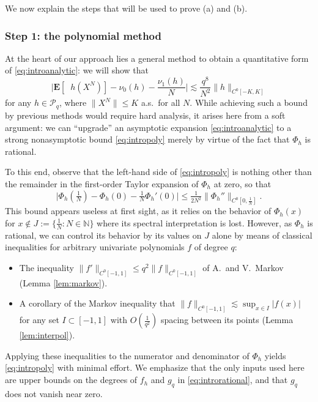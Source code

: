 \documentclass[10pt,reqno]{amsart}
\theoremstyle{definition}
\theoremstyle{remark}
\numberwithin{equation}{section}
\numberwithin{figure}{section}
\numberwithin{table}{section}
\newcommand{\ntrN}{\mathop{\mathrm{tr}_N}}
\newcommand{\EE}{\mathbf{E}}
\begin{document}
We now explain the steps that will be used to prove (a) and (b). 



\subsubsection*{\bf Step 1: the polynomial method}

At the heart of our approach lies a general method to obtain a
quantitative form of \eqref{eq:introanalytic}: we will show that
\begin{equation}
\label{eq:intropoly}
	\bigg|\EE[\ntrN h(X^N)]-\nu_0(h) - \frac{\nu_1(h)}{N}\bigg|
	\lesssim \frac{q^8}{N^2}\|h\|_{C^0[-K,K]}
\end{equation}
for any $h\in\mathcal{P}_q$,
where $\|X^N\|\le K$ a.s.\ for all $N$. While 
achieving such a bound by previous methods would require hard analysis, it 
arises here from a soft argument: we can ``upgrade'' an asymptotic 
expansion \eqref{eq:introanalytic} to a strong nonasymptotic bound 
\eqref{eq:intropoly} merely by virtue of the fact that $\Phi_h$ is 
rational.

To this end, observe that the left-hand side of 
\eqref{eq:intropoly} is nothing other than the remainder in the 
first-order Taylor expansion of $\Phi_h$ at zero, so that
$$
	\big|\Phi_h(\tfrac{1}{N}) - \Phi_h(0) - \tfrac{1}{N}\Phi_h'(0)
	\big| \le \tfrac{1}{2N^2}\|\Phi_h''\|_{C^0[0,\frac{1}{N}]}.
$$
This bound appears useless at first sight, as it relies on the behavior 
of $\Phi_h(x)$ for $x\not\in J:=\{\frac{1}{N}:N\in\mathbb{N}\}$ where its 
spectral interpretation is lost. However, as $\Phi_h$ is rational, we 
can control its behavior by its values on $J$ alone
by means of classical 
inequalities for arbitrary univariate polynomials $f$ of degree $q$:
\vspace*{.5mm}
\begin{itemize}[leftmargin=*]
\addtolength{\itemsep}{.2cm}
\item The inequality
$\|f'\|_{C^0[-1,1]}\le q^2\|f\|_{C^0[-1,1]}$ 
of A.\ and V.\ Markov (Lemma \ref{lem:markov}).
\item A corollary of the Markov inequality that
$\|f\|_{C^0[-1,1]}\lesssim\sup_{x\in I}|f(x)|$ for any set
$I\subset[-1,1]$ with $O(\frac{1}{q^2})$ spacing between its points
(Lemma \ref{lem:interpol}).
\end{itemize}
\vspace*{.5mm}
Applying these inequalities to the numerator and denominator of
$\Phi_h$ yields \eqref{eq:intropoly} with minimal effort.
We emphasize that the only
inputs used here are upper bounds on the degrees of $f_h$ and $g_q$ 
in \eqref{eq:introrational}, and that $g_q$ does not vanish near zero.
\end{document}
